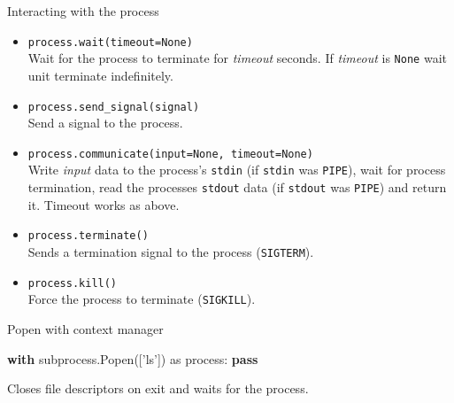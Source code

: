 \documentclass[ignorenonframetext,]{beamer}
\newenvironment{Shaded}{}{}
\newcommand{\KeywordTok}[1]{\textcolor[rgb]{0.00,0.44,0.13}{\textbf{{#1}}}}
\newcommand{\CharTok}[1]{\textcolor[rgb]{0.25,0.44,0.63}{{#1}}}
\newcommand{\StringTok}[1]{\textcolor[rgb]{0.25,0.44,0.63}{{#1}}}
\newcommand{\NormalTok}[1]{{#1}}
\begin{document}
\begin{frame}{Interacting with the process}

\begin{itemize}
\item
  \texttt{process.wait(timeout=None)}\\Wait for the process to terminate
  for \emph{timeout} seconds. If \emph{timeout} is \texttt{None} wait
  unit terminate indefinitely.
\item
  \texttt{process.send\_signal(signal)}\\Send a signal to the process.
\end{itemize}

\end{frame}

\begin{frame}

\begin{itemize}
\itemsep1pt\parskip0pt
\item
  \texttt{process.communicate(input=None,\ timeout=None)}\\Write
  \emph{input} data to the process's \texttt{stdin} (if \texttt{stdin}
  was \texttt{PIPE}), wait for process termination, read the processes
  \texttt{stdout} data (if \texttt{stdout} was \texttt{PIPE}) and return
  it. Timeout works as above.
\end{itemize}

\end{frame}

\begin{frame}

\begin{itemize}
\item
  \texttt{process.terminate()}\\Sends a termination signal to the
  process (\texttt{SIGTERM}).
\item
  \texttt{process.kill()}\\Force the process to terminate
  (\texttt{SIGKILL}).
\end{itemize}

\end{frame}

\begin{frame}[fragile]{Popen with context manager}

\begin{Shaded}
\begin{Highlighting}[]
\KeywordTok{with} \NormalTok{subprocess.Popen([}\StringTok{'ls'}\NormalTok{]) }\CharTok{as} \NormalTok{process:}
    \KeywordTok{pass}
\end{Highlighting}
\end{Shaded}

Closes file descriptors on exit and waits for the process.

\end{frame}
\end{document}
